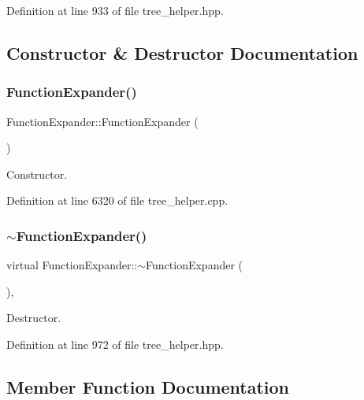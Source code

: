 Definition at line 933 of file tree\+\_\+helper.\+hpp.



\subsection{Constructor \& Destructor Documentation}
\mbox{\label{classFunctionExpander_a60b78226d9dafb0699a53eaea11dd882}} 
\subsubsection{\texorpdfstring{Function\+Expander()}{FunctionExpander()}}
{\footnotesize\ttfamily Function\+Expander\+::\+Function\+Expander (\begin{DoxyParamCaption}{ }\end{DoxyParamCaption})}



Constructor. 



Definition at line 6320 of file tree\+\_\+helper.\+cpp.

\mbox{\label{classFunctionExpander_aacb59907fe75209a0d72b46de85bc642}} 
\subsubsection{\texorpdfstring{$\sim$\+Function\+Expander()}{~FunctionExpander()}}
{\footnotesize\ttfamily virtual Function\+Expander\+::$\sim$\+Function\+Expander (\begin{DoxyParamCaption}{ }\end{DoxyParamCaption})\hspace{0.3cm}{\ttfamily [inline]}, {\ttfamily [virtual]}}



Destructor. 



Definition at line 972 of file tree\+\_\+helper.\+hpp.



\subsection{Member Function Documentation}
\mbox{\label{classFunctionExpander_aff5d724386bc6bda3ceb080d8b20889d}} 
